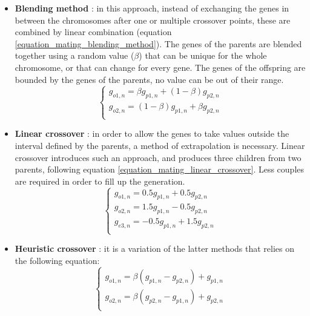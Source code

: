 \documentclass{ametsoc}
\begin{document}
\begin{itemize}
	\item \textbf{Blending method} \citep{Radcliffe1991a}: in this approach, instead of exchanging the genes in between the chromosomes after one or multiple crossover points, these are combined by linear combination (equation \ref{equation_mating_blending_method}). The genes of the parents are blended together using a random value ($\beta$) that can be unique for the whole chromosome, or that can change for every gene. The genes of the offspring are bounded by the genes of the parents, no value can be out of their range.
	\begin{equation}
	\left\lbrace \begin{array}{l} 
	g_{o1,n} = \beta g_{p1,n} + (1-\beta)g_{p2,n} \\ 
	g_{o2,n} = (1-\beta) g_{p1,n} + \beta g_{p2,n} \\
	\end{array} \right.
	\label{equation_mating_blending_method}
	\end{equation}
	
	\item \textbf{Linear crossover} \citep{Wright1991a}: in order to allow the genes to take values outside the interval defined by the parents, a method of extrapolation is necessary. Linear crossover introduces such an approach, and produces three children from two parents, following equation \ref{equation_mating_linear_crossover}. Less couples are required in order to fill up the generation.
	\begin{equation}
	\left\lbrace \begin{array}{l} 
	g_{o1,n} = 0.5 g_{p1,n} + 0.5 g_{p2,n} \\ 
	g_{o2,n} = 1.5 g_{p1,n} - 0.5 g_{p2,n} \\ 
	g_{e3,n} = - 0.5 g_{p1,n} + 1.5 g_{p2,n} \\ 
	\end{array} \right.
	\label{equation_mating_linear_crossover}
	\end{equation}
	
	\item \textbf{Heuristic crossover} \citep{Michalewicz1996}: it is a variation of the latter methods that relies on the following equation:
	\begin{equation}
	\left\lbrace \begin{array}{l} 
	g_{o1,n} = \beta (g_{p1,n} - g_{p2,n}) + g_{p1,n} \\
	g_{o2,n} = \beta (g_{p2,n} - g_{p1,n}) + g_{p2,n} \\
	\end{array} \right.
	\label{equation_mating_heuristic_crossover}
	\end{equation}
	

\end{itemize}
\end{document}
